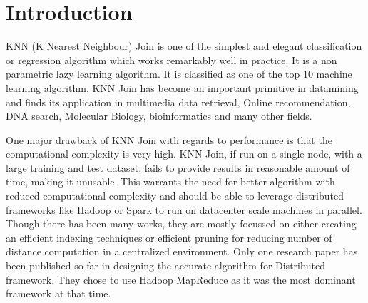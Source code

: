 \documentclass[12pt]{article}
\begin{document}






%



\section{Introduction}

KNN (K Nearest Neighbour) Join is one of the simplest and elegant
classification or regression algorithm which works remarkably well in
practice. It is a non parametric lazy learning algorithm. It is
classified as one of the top 10 machine learning algorithm. KNN Join
has become an important primitive in datamining and
finds its application in multimedia data retrieval, Online
recommendation, DNA search,
Molecular Biology, bioinformatics  and
many other fields.

\medskip

One major drawback of KNN Join with regards to performance is that the computational complexity is
very high. KNN Join, if run on a single node, with a
large training and test dataset, fails to provide results in reasonable amount of time, making it
unusable. This warrants the need for better algorithm with
reduced computational complexity and should be able to
leverage distributed frameworks like Hadoop \cite{_hadoop_mr} or Spark
\cite{_apache_spark} to run on datacenter scale machines in parallel.
Though there has been many works, they are mostly focussed on either creating
an efficient indexing techniques or efficient pruning for reducing
number of distance computation in a centralized environment.
Only one
research paper \cite{lu_efficient_2012} has been published so far in
designing the accurate algorithm
for Distributed framework. They chose to use Hadoop MapReduce as it
was the most dominant framework at that time.
\end{document}
